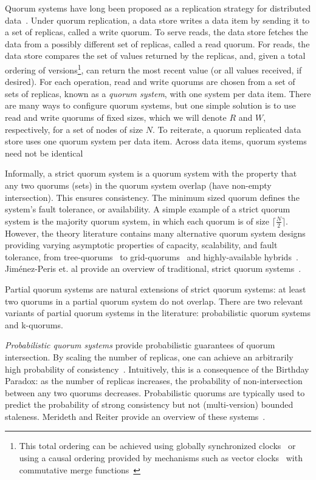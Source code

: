 \documentclass{vldb}
\begin{document}
Quorum systems have long been proposed as a replication strategy for
distributed data~\cite{quorums-start}.  Under quorum replication, a
data store writes a data item by sending it to a set of replicas,
called a write quorum.  To serve reads, the data store fetches the
data from a possibly different set of replicas, called a read quorum.
For reads, the data store compares the set of values returned by the
replicas, and, given a total ordering of versions\footnote{This
  total ordering can be achieved using globally synchronized
  clocks~\cite{synch-clocks} or using a causal ordering provided by
  mechanisms such as vector clocks~\cite{vectorclock} with commutative
  merge functions~\cite{cops}}, can return the most recent value (or
all values received, if desired).  For each operation, read and write
quorums are chosen from a set of sets of replicas, known as a
\textit{quorum system}, with one system per data item.  There are many
ways to configure quorum systems, but one simple solution is to use
read and write quorums of fixed sizes, which we will denote $R$ and
$W$, respectively, for a set of nodes of size $N$.  To reiterate, a
quorum replicated data store uses one quorum system per data item.
Across data items, quorum systems need not be identical

Informally, a strict quorum system is a quorum system with the
property that any two quorums (sets) in the quorum system overlap
(have non-empty intersection). This ensures consistency.  The minimum
sized quorum defines the system's fault tolerance, or availability.  A
simple example of a strict quorum system is the majority quorum
system, in which each quorum is of size $\lceil \frac{N}{2}\rceil$.
However, the theory literature contains many alternative quorum system
designs providing varying asymptotic properties of capacity,
scalability, and fault tolerance, from tree-quorums~\cite{treequorum}
to grid-quorums~\cite{quorumsystems} and highly-available
hybrids~\cite{92-quorums}.  Jim\'{e}nez-Peris et. al provide an
overview of traditional, strict quorum
systems~\cite{quorums-alternative}.

Partial quorum systems are natural extensions of strict quorum
systems: at least two quorums in a partial quorum system do not
overlap.  There are two relevant variants of partial quorum systems in
the literature: probabilistic quorum systems and k-quorums.

\textit{Probabilistic quorum systems} provide probabilistic guarantees
of quorum intersection.  By scaling the number of replicas, one can
achieve an arbitrarily high probability of
consistency~\cite{prob-quorum}.  Intuitively, this is a consequence of
the Birthday Paradox: as the number of replicas increases, the
probability of non-intersection between any two quorums decreases.
Probabilistic quorums are typically used to predict the probability of
strong consistency but not (multi-version) bounded staleness.
Merideth and Reiter provide an overview of these
systems~\cite{quorum-overview}.
\end{document}

